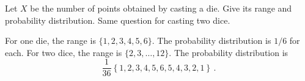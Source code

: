 

Let $X$ be the number of points obtained by casting a die.
Give its range and probability distribution.
Same question for casting two dice.


For one die, the range is $\{1, 2, 3, 4, 5, 6\}$.
The probability distribution is $1/6$ for each.
For two dice, the range is $\{2, 3, \ldots , 12\}$.
The probability distribution is
\begin{equation*}
  \frac{1}{36} \left\{ 1, 2, 3, 4, 5, 6, 5, 4, 3, 2, 1 \right\}
  \, .
\end{equation*}
